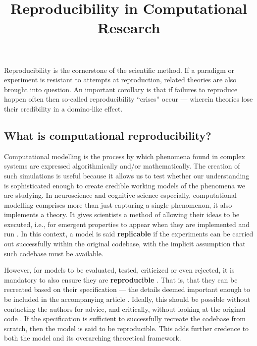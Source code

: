 \documentclass[jou]{apa6}
\title{Reproducibility in Computational Research}
\begin{document}
\maketitle


Reproducibility is the cornerstone of the scientific method.
If a paradigm or experiment is resistant to attempts at reproduction, related theories are also brought into question.
An important corollary is that if failures to reproduce happen often then so-called reproducibility ``crises'' occur --- wherein theories lose their credibility in a domino-like effect.

\subsection*{What is computational reproducibility?}
Computational modelling is the process by which phenomena found in complex systems are expressed algorithmically and/or mathematically.
The creation of such simulations is useful because it allows us to test whether our understanding is sophisticated enough to create credible working models of the phenomena we are studying.
In neuroscience and cognitive science especially, computational modelling comprises more than just capturing a single phenomenon, it also  implements a theory.
It gives scientists a method of allowing their ideas to be executed, i.e., for emergent properties to appear when they are implemented and run \cite{mcclelland09}.
In this context, a model is said \textbf{replicable} if the experiments can be carried out successfully within the original codebase, with the implicit assumption that such codebase must be available.

However, for models to be evaluated, tested, criticized or even rejected, it is mandatory to also ensure they are \textbf{reproducible} \cite{topalidou15}.  
That is, that they can be recreated based on their specification --- the details deemed important enough to be included in the accompanying article \cite{hinsen15}.
Ideally, this should be possible without contacting the authors for advice, and critically, without looking at the original code \cite{cooper14}.
If the specification is sufficient to successfully recreate the codebase from scratch, then the model is said to be reproducible.
This adds further credence to both the model and its overarching theoretical framework.
\end{document}
